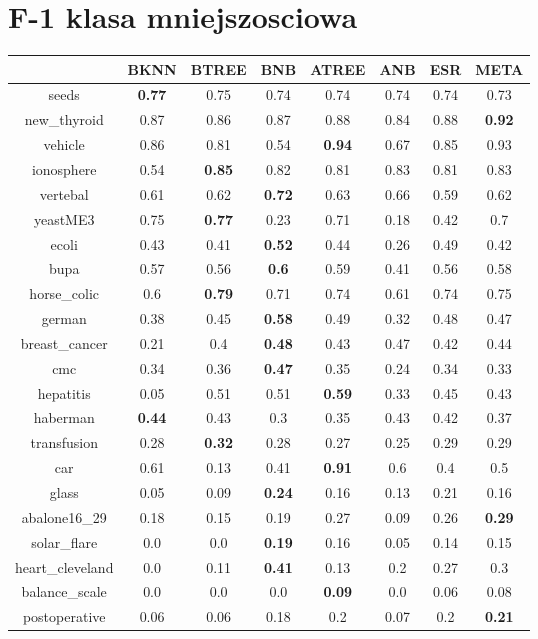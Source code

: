 \documentclass{article}%
\begin{document}
%
\section*{F{-}1 klasa mniejszosciowa}%
\begin{tabular}{c|ccccccc}%
\hline%
&BKNN&BTREE&BNB&ATREE&ANB&ESR&META\\%
\hline%
seeds&\textbf{0.77}&0.75&0.74&0.74&0.74&0.74&0.73\\%
new\_thyroid&0.87&0.86&0.87&0.88&0.84&0.88&\textbf{0.92}\\%
vehicle&0.86&0.81&0.54&\textbf{0.94}&0.67&0.85&0.93\\%
ionosphere&0.54&\textbf{0.85}&0.82&0.81&0.83&0.81&0.83\\%
vertebal&0.61&0.62&\textbf{0.72}&0.63&0.66&0.59&0.62\\%
yeastME3&0.75&\textbf{0.77}&0.23&0.71&0.18&0.42&0.7\\%
ecoli&0.43&0.41&\textbf{0.52}&0.44&0.26&0.49&0.42\\%
bupa&0.57&0.56&\textbf{0.6}&0.59&0.41&0.56&0.58\\%
horse\_colic&0.6&\textbf{0.79}&0.71&0.74&0.61&0.74&0.75\\%
german&0.38&0.45&\textbf{0.58}&0.49&0.32&0.48&0.47\\%
breast\_cancer&0.21&0.4&\textbf{0.48}&0.43&0.47&0.42&0.44\\%
cmc&0.34&0.36&\textbf{0.47}&0.35&0.24&0.34&0.33\\%
hepatitis&0.05&0.51&0.51&\textbf{0.59}&0.33&0.45&0.43\\%
haberman&\textbf{0.44}&0.43&0.3&0.35&0.43&0.42&0.37\\%
transfusion&0.28&\textbf{0.32}&0.28&0.27&0.25&0.29&0.29\\%
car&0.61&0.13&0.41&\textbf{0.91}&0.6&0.4&0.5\\%
glass&0.05&0.09&\textbf{0.24}&0.16&0.13&0.21&0.16\\%
abalone16\_29&0.18&0.15&0.19&0.27&0.09&0.26&\textbf{0.29}\\%
solar\_flare&0.0&0.0&\textbf{0.19}&0.16&0.05&0.14&0.15\\%
heart\_cleveland&0.0&0.11&\textbf{0.41}&0.13&0.2&0.27&0.3\\%
balance\_scale&0.0&0.0&0.0&\textbf{0.09}&0.0&0.06&0.08\\%
postoperative&0.06&0.06&0.18&0.2&0.07&0.2&\textbf{0.21}\\%
\end{tabular}

%
\end{document}

